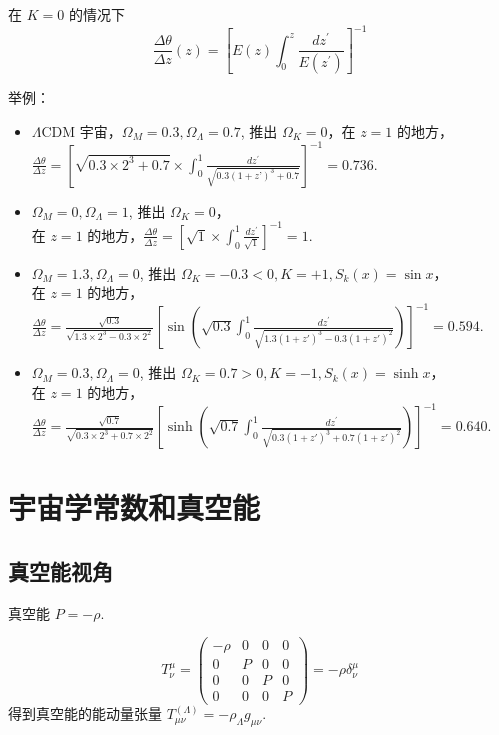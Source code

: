 \documentclass[12pt]{ctexart}
\begin{document}
在 $K=0$ 的情况下 
\begin{equation}
    \frac{\Delta \theta}{\Delta z}(z)= \left[E(z) \int_{0}^{z} \frac{d z^{\prime}}{E\left(z^{\prime}\right)}\right]^{-1}
\end{equation}

举例：
\begin{itemize}
    \item $\Lambda$CDM 宇宙，$\Omega_M=0.3,\Omega_\Lambda=0.7$, 推出 $\Omega_K=0$，在 $z=1$ 的地方，$\frac{\Delta \theta}{\Delta z}=\left[\sqrt{0.3 \times 2^{3}+0.7} \times \int_{0}^{1} \frac{d z^{\prime}}{\sqrt{0.3\left(1+z’\right)^{3}+0.7}}\right]^{-1}=0.736.$ 
    \item $\Omega_M=0, \Omega_\Lambda=1$, 推出 $\Omega_K=0$，\\ 在 $z=1$ 的地方，$\frac{\Delta \theta}{\Delta z}=\left[\sqrt{1} \times \int_{0}^{1} \frac{d z^{\prime}}{\sqrt{1}}\right]^{-1}=1.$ 
    \item $\Omega_M=1.3, \Omega_\Lambda=0$, 推出 $\Omega_K=-0.3<0, K=+1, S_k(x)=\sin x$，\\ 在 $z=1$ 的地方，\\$\frac{\Delta \theta}{\Delta z}=\frac{\sqrt{0.3}}{\sqrt{1.3\times 2^3-0.3\times 2^2}}\left[\sin(\sqrt{0.3}  \int_{0}^{1} \frac{d z^{\prime}}{\sqrt{1.3(1+z')^3 - 0.3 (1+z')^2}})\right]^{-1}=0.594.$  
    \item $\Omega_M=0.3, \Omega_\Lambda=0$, 推出 $\Omega_K=0.7>0, K=-1, S_k(x)=\sinh x$，\\ 在 $z=1$ 的地方，\\ $\frac{\Delta \theta}{\Delta z}=\frac{\sqrt{0.7}}{\sqrt{0.3\times 2^3 + 0.7\times 2^2}}\left[\sinh(\sqrt{0.7}  \int_{0}^{1} \frac{d z^{\prime}}{\sqrt{0.3(1+z')^3 + 0.7 (1+z')^2}})\right]^{-1}=0.640.$  
\end{itemize}

\section{宇宙学常数和真空能}

\subsection{真空能视角}
真空能 $P=-\rho$.

\begin{equation} 
    T^\mu_{\nu} = \left(\begin{array}{llll}-\rho & 0 & 0 & 0 \\ 0 & P & 0 & 0 \\ 0& 0& P &0 \\ 0 & 0&0&P\end{array}\right) = -\rho \delta^\mu_{\nu}
\end{equation}
得到真空能的能动量张量 $T_{\mu\nu}^{(\Lambda)}=- \rho_\Lambda g_{\mu\nu}$.
\end{document}
